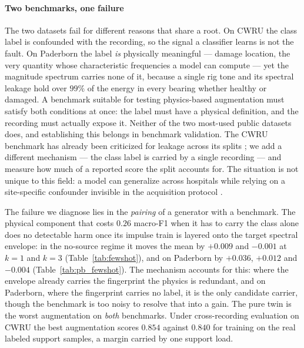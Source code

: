 \documentclass[journal]{IEEEtran}
\begin{document}
\paragraph{Two benchmarks, one failure} The two datasets fail for different
reasons that share a root.
On CWRU the class label is confounded with the recording, so the signal a
classifier learns is not the fault. On Paderborn the label \emph{is} physically
meaningful --- damage location, the very quantity whose characteristic
frequencies a model can compute --- yet the magnitude spectrum carries none of
it, because a single rig tone and its spectral leakage hold over $99\%$ of the
energy in every bearing whether healthy or damaged. A benchmark suitable for testing
physics-based augmentation must satisfy both conditions at once: the label must
have a physical definition, and the recording must actually expose it. Neither
of the two most-used public datasets does, and establishing this belongs in
benchmark validation. The CWRU benchmark has already been criticized for leakage across its
splits \cite{hendriks2022benchmark}; we add a different mechanism --- the
class label is carried by a single recording --- and measure how much of a
reported score the split accounts for. The situation is not unique to this field: a model can generalize
across hospitals while relying on a site-specific confounder invisible in the
acquisition protocol \cite{zech2018variable}.

The failure we diagnose lies in the \emph{pairing} of a generator with a
benchmark. The physical component that costs $0.26$
macro-F1 when it has to carry the class alone does no detectable harm once its
impulse train is layered onto the target spectral envelope: in the no-source
regime it moves the mean by $+0.009$ and $-0.001$ at $k=1$ and $k=3$
(Table~\ref{tab:fewshot}), and on Paderborn by $+0.036$, $+0.012$ and $-0.004$
(Table~\ref{tab:pb_fewshot}). The mechanism accounts for this: where the envelope
already carries the fingerprint the physics is redundant, and on Paderborn,
where the fingerprint carries no label, it is the only candidate carrier, though
the benchmark is too noisy to resolve that into a gain. The pure twin is the
worst augmentation on \emph{both} benchmarks. Under cross-recording evaluation
on CWRU the best augmentation scores $0.854$ against $0.840$ for training on the
real labeled support samples, a margin carried by one support load.
\end{document}
